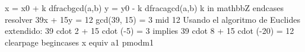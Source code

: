 {}x = x\markdownRendererUnderscore{}0 + k \markdownRendererBackslash{}dfrac\markdownRendererLeftBrace{}b\markdownRendererRightBrace{}\markdownRendererLeftBrace{}\markdownRendererBackslash{}gcd(a,b)\markdownRendererRightBrace{} \markdownRendererBackslash{}\markdownRendererBackslash{}\markdownRendererSoftLineBreak
{}y = y\markdownRendererUnderscore{}0 - k \markdownRendererBackslash{}dfrac\markdownRendererLeftBrace{}a\markdownRendererRightBrace{}\markdownRendererLeftBrace{}\markdownRendererBackslash{}gcd(a,b)\markdownRendererRightBrace{} \markdownRendererBackslash{}\markdownRendererBackslash{}\markdownRendererSoftLineBreak
{}k \markdownRendererBackslash{}in \markdownRendererBackslash{}mathbb\markdownRendererLeftBrace{}Z\markdownRendererRightBrace{}\markdownRendererSoftLineBreak
{}\markdownRendererBackslash{}end\markdownRendererLeftBrace{}cases\markdownRendererRightBrace{}\markdownRendererSoftLineBreak
{}\markdownRendererDollarSign{}\markdownRendererDollarSign{}\markdownRendererParagraphSeparator
{} resolver \markdownRendererDollarSign{}39x + 15y = 12\markdownRendererDollarSign{} \markdownRendererDollarSign{}\markdownRendererBackslash{}gcd(39, 15) = 3 \markdownRendererBackslash{}mid 12\markdownRendererDollarSign{}\markdownRendererParagraphSeparator
{}Usando el algoritmo de Euclides extendido:\markdownRendererParagraphSeparator
{}\markdownRendererDollarSign{}39 \markdownRendererBackslash{}cdot 2 + 15 \markdownRendererBackslash{}cdot (-5) = 3 \markdownRendererBackslash{}implies 39 \markdownRendererBackslash{}cdot 8 + 15 \markdownRendererBackslash{}cdot (-20) = 12\markdownRendererDollarSign{}\markdownRendererInterblockSeparator
{}\markdownRendererInterblockSeparator
{}\markdownRendererDollarSign{}\markdownRendererBackslash{}clearpage\markdownRendererDollarSign{}\markdownRendererInterblockSeparator
{}\markdownRendererSectionBegin
{}\markdownRendererInterblockSeparator
{}\markdownRendererParagraphSeparator
{}\markdownRendererDollarSign{}\markdownRendererDollarSign{}\markdownRendererSoftLineBreak
{}\markdownRendererBackslash{}begin\markdownRendererLeftBrace{}cases\markdownRendererRightBrace{}\markdownRendererSoftLineBreak
{}x \markdownRendererBackslash{}equiv a\markdownRendererUnderscore{}1 \markdownRendererBackslash{}pmod\markdownRendererLeftBrace{}m\markdownRendererUnderscore{}1\markdownRendererRightBrace{} \markdownRendererBackslash{}\markdownRendererBackslash{}\markdownRendererSoftLineBreak
